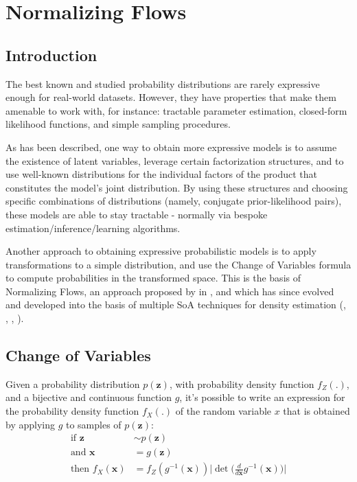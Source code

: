 \chapter{Normalizing Flows}
\label{chapter:probmodel}

\section{Introduction}
The best known and studied probability distributions are rarely expressive
enough for real-world datasets. However, they have properties that make them
amenable to work with, for instance: tractable parameter estimation, closed-form
likelihood functions, and simple sampling procedures.

As has been described, one way to obtain more expressive models is to assume the
existence of latent variables, leverage certain factorization structures, and to
use well-known distributions for the individual factors of the product that
constitutes the model's joint distribution. By using these structures and choosing
specific combinations of distributions (namely, conjugate prior-likelihood pairs),
these models are able to stay tractable - normally via bespoke estimation/inference/learning
algorithms.


Another approach to obtaining expressive probabilistic models is to apply
transformations to a simple distribution, and use the Change of Variables
formula to compute probabilities in the transformed space. This is the basis
of Normalizing Flows, an approach proposed by \citeauthor{shakir_nf} in \cite{shakir_nf},
and which has since evolved and developed into the basis of multiple SoA techniques
for density estimation (\cite{Glow}, \cite{real-nvp}, \cite{bnaf19},
\cite{NIPS2017_6828}).

\section{Change of Variables}
Given a probability distribution $p(\bm{z})$, with probability density function $f_Z(.)$,
and a bijective and continuous function $g$, it's possible to write an expression
for the probability density function $f_X(.)$ of the random variable $x$ that is
obtained by applying $g$ to samples of $p(\bm{z})$:
\begin{align}
    \mbox{if } \bm{z} &\sim p(\bm{z}) \\
    \mbox{and } \bm{x} &= g(\bm{z}) \\
    \mbox{then } f_X(\bm{x}) &= f_Z(g^{-1}(\bm{x}))\Big|\det\Big(\frac{d}{d\bm{x}}g^{-1}(\bm{x})\Big)\Big|
\end{align}

